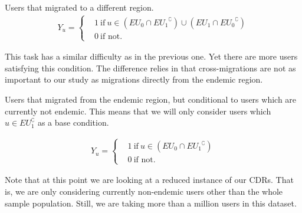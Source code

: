 \begin{problem}\label{target3}
Users that migrated to a different region.
\begin{align*}
			Y_u =
			\begin{cases}
				&1 \ \mbox{if} \ u \in (EU_{0} \cap { EU_{1} }^{\complement}) \cup (EU_{1} \cap { EU_{0} }^{\complement}) \\
				&0 \ \mbox{if not}.
			\end{cases}
		\end{align*}
\end{problem}

This task has a similar difficulty as in the previous one.
Yet there are more users satisfying this condition.
The difference relies in that cross-migrations are not as important to our study as migrations directly from the endemic region.


\begin{problem}\label{target4}
Users that migrated from the endemic region, but conditional to users which are currently not endemic.
This means that we will only consider users which $u \in EU_{1}^{\complement}$ as a base condition.

\begin{align*}
			Y_u =
			\begin{cases}
				& 1 \ \mbox{if} \ u \in ( EU_{0} \cap { EU_{1} }^{\complement})    \\
				& 0 \ \mbox{if not}.
			\end{cases}
		\end{align*}
\end{problem}

Note that at this point we are looking at a reduced instance of our CDRs.
That is, we are only considering currently non-endemic users other than the whole sample population.
Still, we are taking more than a million users in this dataset.




